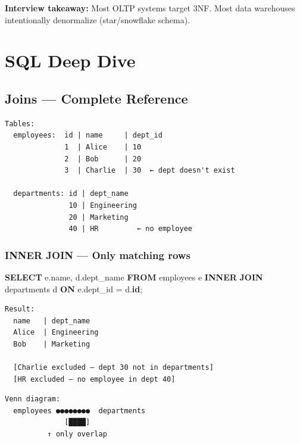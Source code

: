\documentclass[11pt]{article}
\newenvironment{Shaded}{\begin{snugshade}}{\end{snugshade}}
\newcommand{\KeywordTok}[1]{\textcolor[rgb]{0.81,0.81,0.76}{\textbf{#1}}}
\newcommand{\NormalTok}[1]{\textcolor[rgb]{0.81,0.81,0.76}{#1}}
\newcommand{\OperatorTok}[1]{\textcolor[rgb]{0.81,0.81,0.76}{#1}}
\begin{document}
\textbf{Interview takeaway:} Most OLTP systems target 3NF. Most data warehouses intentionally denormalize (star/snowflake schema).

\section{SQL Deep Dive}\label{sql-deep-dive}

\subsection{Joins --- Complete Reference}\label{joins--complete-reference}

\setcodelang{}

\begin{verbatim}
Tables:
  employees:  id | name     | dept_id
              1  | Alice    | 10
              2  | Bob      | 20
              3  | Charlie  | 30  ← dept doesn't exist

  departments: id | dept_name
               10 | Engineering
               20 | Marketing
               40 | HR         ← no employee
\end{verbatim}

\subsubsection{INNER JOIN --- Only matching rows}\label{inner-join--only-matching-rows}


\begin{Shaded}
\begin{Highlighting}[]
\KeywordTok{SELECT}\NormalTok{ e.name, d.dept\_name}
\KeywordTok{FROM}\NormalTok{ employees e}
\KeywordTok{INNER} \KeywordTok{JOIN}\NormalTok{ departments d }\KeywordTok{ON}\NormalTok{ e.dept\_id }\OperatorTok{=}\NormalTok{ d.}\KeywordTok{id}\NormalTok{;}
\end{Highlighting}
\end{Shaded}

\setcodelang{}

\begin{verbatim}
Result:
  name   | dept_name
  Alice  | Engineering
  Bob    | Marketing

  [Charlie excluded — dept 30 not in departments]
  [HR excluded — no employee in dept 40]
\end{verbatim}

\setcodelang{}

\begin{verbatim}
Venn diagram:
  employees ●●●●●●●●  departments
              [████]
          ↑ only overlap
\end{verbatim}
\end{document}
